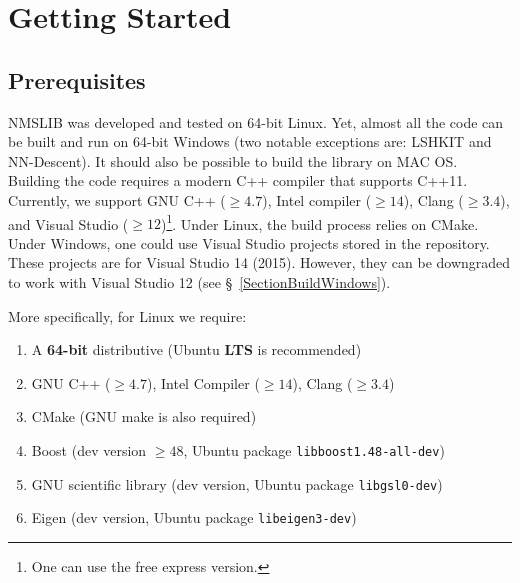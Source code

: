 \documentclass[runningheads,a4paper]{llncs}
\newcommand{\ttt}[1]{\texttt{#1}}
\begin{document}
{%

\section{Getting Started}
\subsection{Prerequisites}
NMSLIB was developed and tested on 64-bit Linux.
Yet, almost all the code can be built and run on 64-bit Windows (two notable exceptions are: LSHKIT and NN-Descent).
It should also be possible to build the library on MAC OS.
Building the code requires a modern C++ compiler that supports \mbox{C++11}.
Currently, we support GNU C++ ($\ge4.7$), Intel compiler ($\ge14$), 
Clang ($\ge3.4$), 
and Visual Studio ($\ge12$)\footnote{One can use the free express version.}.
Under Linux, the build process relies on CMake. 
Under Windows, one could use Visual Studio projects stored in the repository.
These projects are for Visual Studio 14 (2015). 
However, they can be downgraded to work with Visual Studio 12 (see \S~\ref{SectionBuildWindows}).


More specifically, for Linux we require:
\begin{enumerate}
\item A \textbf{64-bit} distributive (Ubuntu \textbf{LTS} is recommended)
\item GNU C++ ($\ge4.7$), Intel Compiler ($\ge14$), Clang ($\ge3.4$)
\item CMake (GNU make is also required)
\item Boost (dev version $\ge48$, Ubuntu package \ttt{libboost1.48-all-dev})
\item GNU scientific library (dev version, Ubuntu package \ttt{libgsl0-dev})
\item Eigen (dev version, Ubuntu package \ttt{libeigen3-dev})
\end{enumerate}

}
\end{document}
